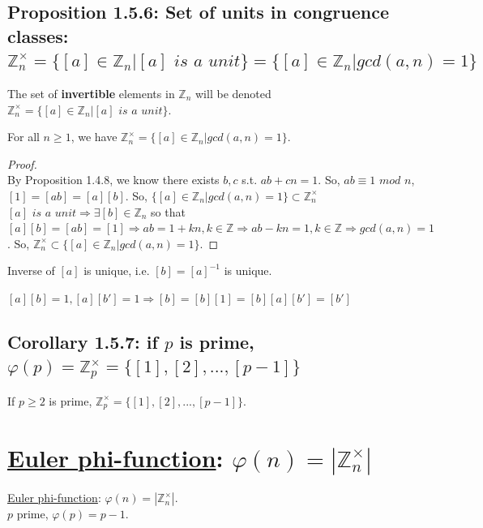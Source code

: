 \documentclass[11pt]{elegantbook}
\begin{document}
\subsection{Proposition 1.5.6: Set of units in congruence classes: $\mathbb{Z}_n^{\times}=\{[a]\in\mathbb{Z}_n|[a] \textit{ is a unit}\}=\{[a]\in\mathbb{Z}_n|gcd(a,n)=1\}$}
The set of \textbf{invertible} elements in $\mathbb{Z}_n$ will be denoted $\mathbb{Z}_n^{\times}=\{[a]\in\mathbb{Z}_n|[a] \textit{ is a unit}\}$.
\begin{proposition}[Proposition 1.5.6.]
For all $n\geq 1$, we have $\mathbb{Z}_n^{\times}=\{[a]\in\mathbb{Z}_n|gcd(a,n)=1\}$.
\end{proposition}
\begin{proof}
    \quad\\
    By Proposition 1.4.8, we know there exists $b,c$ s.t. $ab+cn=1$. So, $ab \equiv 1 \textit{ mod }n$, $[1]=[ab]=[a][b]$. So, $\{[a]\in\mathbb{Z}_n|gcd(a,n)=1\}\subset \mathbb{Z}_n^{\times}$\\
    $[a] \textit{ is a unit}\Rightarrow $$\exists [b] \in \mathbb{Z}_n$ so that $[a][b] =[ab]= [1]\Rightarrow ab=1+kn, k\in \mathbb{Z}\Rightarrow ab-kn=1, k\in \mathbb{Z} \Rightarrow gcd(a,n)=1$. So, $\mathbb{Z}_n^{\times}\subset \{[a]\in\mathbb{Z}_n|gcd(a,n)=1\}$.
\end{proof}
\begin{note}
Inverse of $[a]$ is unique, i.e. $[b]=[a]^{-1}$ is unique.
\end{note}
$[a][b]=1, [a][b']=1\Rightarrow [b]=[b][1]=[b][a][b']=[b']$

\subsection{Corollary 1.5.7: if $p$ is prime, $\varphi(p)=\mathbb{Z}_p^{\times}=\{[1],[2],...,[p-1] \}$}
\begin{corollary}[Corollary 1.5.7]
If $p\geq2$ is prime, $\mathbb{Z}_p^{\times}=\{[1],[2],...,[p-1] \}$.
\end{corollary}
\section{\underline{Euler phi-function}: $\varphi(n)=|\mathbb{Z}_n^{\times}|$}
\underline{Euler phi-function}: $\varphi(n)=|\mathbb{Z}_n^{\times}|$.\\
$p$ prime, $\varphi(p)=p-1$.\\
\end{document}
